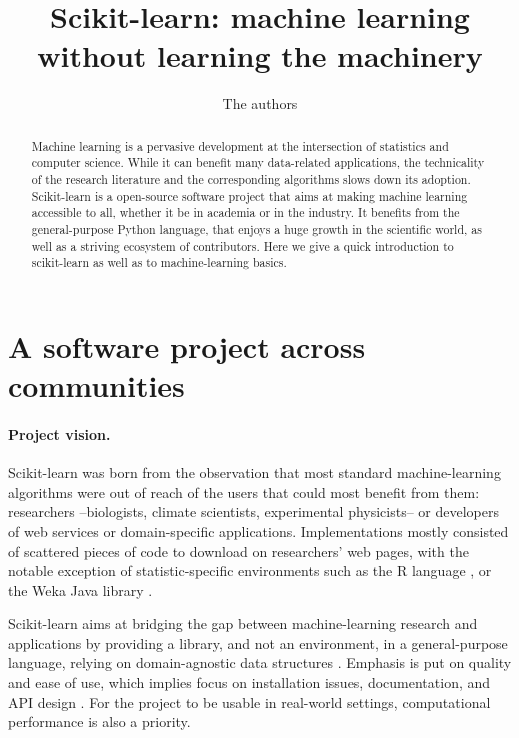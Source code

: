 \documentclass[a4paper]{article}
\title{Scikit-learn: machine learning without learning the machinery}
\author{The authors}
\begin{document}
\lstset{language=Python}

\maketitle

\begin{abstract}
Machine learning is a pervasive development at the intersection of
statistics and computer science. While it can benefit many
data-related applications, the technicality of the research literature
and the corresponding algorithms slows down its adoption. Scikit-learn is
a open-source software project that aims at making machine learning
accessible to all, whether it be in academia or in the industry. It
benefits from
the general-purpose Python language, that enjoys a huge growth in
the scientific world, as well as a striving ecosystem of contributors.
Here we give a quick introduction to scikit-learn as well as to
machine-learning basics.
\end{abstract}

\section{A software project across communities}

\paragraph{Project vision.}
%
Scikit-learn was born from the observation that most standard
machine-learning algorithms were out of reach of the users that could
most benefit from them: researchers --biologists, climate
scientists, experimental physicists-- or developers of web
services or domain-specific applications.
%
Implementations mostly consisted of scattered pieces of code to download
on researchers' web pages, with the notable exception of
statistic-specific environments such as the R language \cite{Rmanual}, or
the Weka Java library \cite{hall2009weka}.

Scikit-learn aims at bridging the gap between machine-learning research and
applications by providing a library, and not an environment, in a
general-purpose language, relying on domain-agnostic data structures
\cite{pedregosa2011}. Emphasis is put on quality and ease of use, which
implies focus on installation issues, documentation, and API design
\cite{buitinck2013ecml}. For the project to be usable in real-world
settings, computational performance is also a priority.
\end{document}
